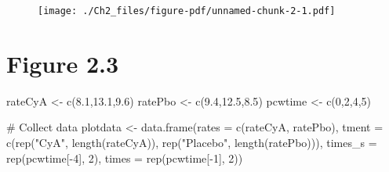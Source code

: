 \documentclass[
  letterpaper,
  DIV=11,
  numbers=noendperiod]{scrreprt}
\newenvironment{Shaded}{\begin{snugshade}}{\end{snugshade}}
\newcommand{\AttributeTok}[1]{\textcolor[rgb]{0.40,0.45,0.13}{#1}}
\newcommand{\CommentTok}[1]{\textcolor[rgb]{0.37,0.37,0.37}{#1}}
\newcommand{\DecValTok}[1]{\textcolor[rgb]{0.68,0.00,0.00}{#1}}
\newcommand{\FloatTok}[1]{\textcolor[rgb]{0.68,0.00,0.00}{#1}}
\newcommand{\FunctionTok}[1]{\textcolor[rgb]{0.28,0.35,0.67}{#1}}
\newcommand{\NormalTok}[1]{\textcolor[rgb]{0.00,0.23,0.31}{#1}}
\newcommand{\OtherTok}[1]{\textcolor[rgb]{0.00,0.23,0.31}{#1}}
\newcommand{\SpecialCharTok}[1]{\textcolor[rgb]{0.37,0.37,0.37}{#1}}
\newcommand{\StringTok}[1]{\textcolor[rgb]{0.13,0.47,0.30}{#1}}
\begin{document}
\begin{figure}[H]

{\centering \texttt{[image: ./Ch2\_files/figure-pdf/unnamed-chunk-2-1.pdf]}

}

\end{figure}

\hypertarget{fig2-3}{%
\section*{Figure 2.3}\label{fig2-3}}


\begin{Shaded}
\begin{Highlighting}[]
\NormalTok{rateCyA }\OtherTok{\textless{}{-}} \FunctionTok{c}\NormalTok{(}\FloatTok{8.1}\NormalTok{,}\FloatTok{13.1}\NormalTok{,}\FloatTok{9.6}\NormalTok{)}
\NormalTok{ratePbo }\OtherTok{\textless{}{-}} \FunctionTok{c}\NormalTok{(}\FloatTok{9.4}\NormalTok{,}\FloatTok{12.5}\NormalTok{,}\FloatTok{8.5}\NormalTok{)}
\NormalTok{pcwtime }\OtherTok{\textless{}{-}} \FunctionTok{c}\NormalTok{(}\DecValTok{0}\NormalTok{,}\DecValTok{2}\NormalTok{,}\DecValTok{4}\NormalTok{,}\DecValTok{5}\NormalTok{)}

\CommentTok{\# Collect data}
\NormalTok{plotdata }\OtherTok{\textless{}{-}} \FunctionTok{data.frame}\NormalTok{(}\AttributeTok{rates =} \FunctionTok{c}\NormalTok{(rateCyA, ratePbo),}
                       \AttributeTok{tment =} \FunctionTok{c}\NormalTok{(}\FunctionTok{rep}\NormalTok{(}\StringTok{"CyA"}\NormalTok{, }\FunctionTok{length}\NormalTok{(rateCyA)), }\FunctionTok{rep}\NormalTok{(}\StringTok{"Placebo"}\NormalTok{, }\FunctionTok{length}\NormalTok{(ratePbo))),}
                       \AttributeTok{times\_s =} \FunctionTok{rep}\NormalTok{(pcwtime[}\SpecialCharTok{{-}}\DecValTok{4}\NormalTok{], }\DecValTok{2}\NormalTok{),}
                       \AttributeTok{times =} \FunctionTok{rep}\NormalTok{(pcwtime[}\SpecialCharTok{{-}}\DecValTok{1}\NormalTok{], }\DecValTok{2}\NormalTok{))}


\end{Highlighting}
\end{Shaded}
\end{document}
